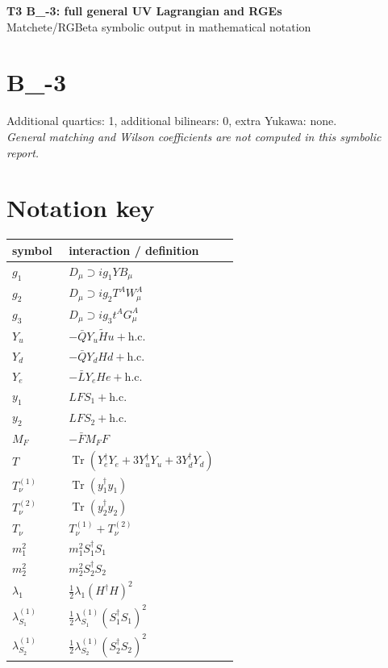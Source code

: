 \documentclass[10pt,a4paper]{article}
\begin{document}
\begin{center}
{\Large\bfseries T3 B\_-3: full general UV Lagrangian and RGEs}\\[4pt]
Matchete/RGBeta symbolic output in mathematical notation
\end{center}
\bigskip
\section*{B\_-3}
Additional quartics: 1, additional bilinears: 0, extra Yukawa: none.\\
\emph{General matching and Wilson coefficients are not computed in this symbolic report.}
\section*{Notation key}
\begin{longtable}{@{}p{0.23\linewidth}p{0.69\linewidth}@{}}
\toprule
symbol & interaction / definition \\
\midrule
$g_1$ & $D_\mu\supset i g_1YB_\mu$ \\
$g_2$ & $D_\mu\supset i g_2T^AW_\mu^A$ \\
$g_3$ & $D_\mu\supset i g_3t^AG_\mu^A$ \\
$Y_u$ & $-\bar QY_u\widetilde Hu+\mathrm{h.c.}$ \\
$Y_d$ & $-\bar QY_dHd+\mathrm{h.c.}$ \\
$Y_e$ & $-\bar LY_eHe+\mathrm{h.c.}$ \\
$y_1$ & $LFS_1+\mathrm{h.c.}$ \\
$y_2$ & $LFS_2+\mathrm{h.c.}$ \\
$M_F$ & $-\bar FM_FF$ \\
$T$ & $\operatorname{Tr}(Y_e^\dagger Y_e+3Y_u^\dagger Y_u+3Y_d^\dagger Y_d)$ \\
$T_\nu^{(1)}$ & $\operatorname{Tr}(y_1^\dagger y_1)$ \\
$T_\nu^{(2)}$ & $\operatorname{Tr}(y_2^\dagger y_2)$ \\
$T_\nu$ & $T_\nu^{(1)}+T_\nu^{(2)}$ \\
$m_1^2$ & $m_1^2S_1^\dagger S_1$ \\
$m_2^2$ & $m_2^2S_2^\dagger S_2$ \\
$\lambda_1$ & $\frac12\lambda_1(H^\dagger H)^2$ \\
$\lambda_{S_1}^{(1)}$ & $\frac12\lambda_{S_1}^{(1)}(S_1^\dagger S_1)^2$ \\
$\lambda_{S_2}^{(1)}$ & $\frac12\lambda_{S_2}^{(1)}(S_2^\dagger S_2)^2$ \\

\end{longtable}
\end{document}
